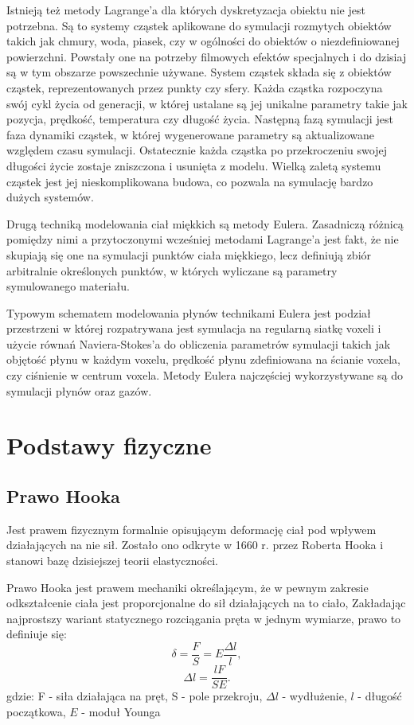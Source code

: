 Istnieją też metody Lagrange'a dla których dyskretyzacja obiektu nie jest
potrzebna. Są to systemy cząstek aplikowane do symulacji rozmytych obiektów takich jak
chmury, woda, piasek, czy w ogólności do obiektów o niezdefiniowanej
powierzchni. Powstały one na potrzeby filmowych efektów specjalnych i do dzisiaj
są w tym obszarze powszechnie używane. System cząstek składa się z obiektów cząstek,
reprezentowanych przez punkty czy sfery. Każda cząstka
rozpoczyna swój cykl życia od generacji, w której ustalane są 
jej unikalne parametry takie jak pozycja, prędkość, temperatura czy długość życia.
Następną fazą symulacji jest faza dynamiki cząstek, w której wygenerowane parametry
są aktualizowane względem czasu symulacji. Ostatecznie każda cząstka po
przekroczeniu swojej długości życie zostaje zniszczona i usunięta z modelu.
Wielką zaletą systemu cząstek jest jej nieskomplikowana budowa, co pozwala na
symulację bardzo dużych systemów. 

Drugą techniką modelowania ciał miękkich są metody Eulera. Zasadniczą różnicą
pomiędzy nimi a przytoczonymi wcześniej metodami Lagrange'a jest fakt, że nie skupiają 
się one na symulacji punktów ciała miękkiego, lecz definiują zbiór arbitralnie
określonych punktów, w których wyliczane są parametry symulowanego materiału.

Typowym schematem modelowania płynów technikami Eulera jest podział przestrzeni w
której rozpatrywana jest symulacja na regularną siatkę voxeli i użycie równań Naviera-Stokes'a do
obliczenia parametrów symulacji takich jak objętość płynu w każdym voxelu,
 prędkość płynu zdefiniowana na ścianie voxela, czy ciśnienie w centrum voxela.
Metody Eulera najczęściej wykorzystywane są do symulacji płynów oraz gazów.

\section{Podstawy fizyczne}
\subsection{Prawo Hooka}
Jest prawem fizycznym formalnie opisującym deformację ciał pod wpływem
działających na nie sił. Zostało ono odkryte w 1660 r. przez Roberta Hooka i 
stanowi bazę dzisiejszej teorii elastyczności\cite{elast}.

Prawo Hooka jest prawem mechaniki określającym, że w pewnym zakresie odkształcenie ciała jest
proporcjonalne do sił działających na to ciało,
Zakładając najprostszy wariant statycznego rozciągania pręta w jednym wymiarze, prawo to definiuje
się:
$$\delta = \frac{F}{S} = E\frac{\Delta l}{l},$$
$$\Delta l = \frac{lF}{SE}.$$
gdzie:
F - siła działająca na pręt,
S - pole przekroju,
$\Delta l$ - wydłużenie,
$l$ - długość początkowa,
$E$ - moduł Younga

